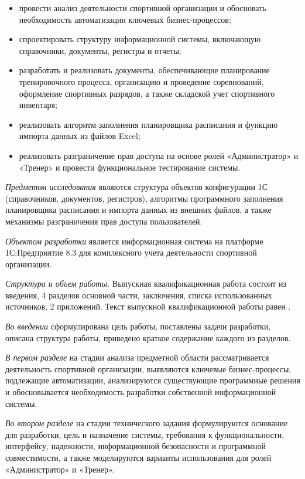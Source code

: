 \begin{itemize}
	\item провести анализ деятельности спортивной организации и обосновать необходимость автоматизации ключевых бизнес-процессов;
	\item спроектировать структуру информационной системы, включающую справочники, документы, регистры и отчеты;
	\item разработать и реализовать документы, обеспечивающие планирование тренировочного процесса, организацию и проведение соревнований, оформление спортивных разрядов, а также складской учет спортивного инвентаря;
	\item реализовать алгоритм заполнения планировщика расписания и функцию импорта данных из файлов Excel;
	\item реализовать разграничение прав доступа на основе ролей «Администратор» и «Тренер» и провести функциональное тестирование системы.
\end{itemize}

\textit{Предметом исследования} являются структура объектов конфигурации 1С (справочников, документов, регистров), алгоритмы программного заполнения планировщика расписания и импорта данных из внешних файлов, а также механизмы разграничения прав доступа пользователей.

\textit{Объектом разработки} является информационная система на платформе 1С:Предприятие 8.3 для комплексного учета деятельности спортивной организации.


\textit{Структура и объем работы.} Выпускная квалификационная работа состоит из введения, 4 разделов основной части, заключения, списка использованных источников, 2 приложений. Текст выпускной квалификационной работы равен .

\textit{Во введении} сформулирована цель работы, поставлены задачи разработки, описана структура работы, приведено краткое содержание каждого из разделов.

\textit{В первом разделе} на стадии анализа предметной области рассматривается деятельность спортивной организации, выявляются ключевые бизнес-процессы, подлежащие автоматизации, анализируются существующие программные решения и обосновывается необходимость разработки собственной информационной системы.

\textit{Во втором разделе} на стадии технического задания формулируются основание для разработки, цель и назначение системы, требования к функциональности, интерфейсу, надежности, информационной безопасности и программной совместимости, а также моделируются варианты использования для ролей «Администратор» и «Тренер».


